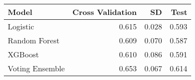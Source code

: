 \begin{tabular}{lrrr}
\toprule
Model & Cross Validation & SD & Test \\
\midrule
Logistic & 0.615 & 0.028 & 0.593 \\
Random Forest & 0.609 & 0.070 & 0.587 \\
XGBoost & 0.610 & 0.086 & 0.591 \\
Voting Ensemble & 0.653 & 0.067 & 0.614 \\
\bottomrule
\end{tabular}
